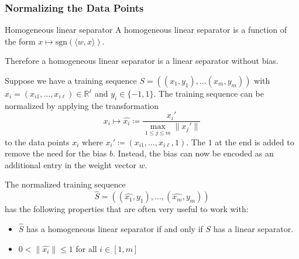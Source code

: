 \documentclass[english]{panikzettel}
\begin{document}
\subsubsection{Normalizing the Data Points}
\begin{defi}{Homogeneous linear separator}
A homogeneous linear separator is a function of the form $x\mapsto \text{sgn}(\langle w,x\rangle)$.
\end{defi}
Therefore a homogeneous linear separator is a linear separator without bias.



Suppose we have a training sequence $S=((x_1,y_1),\ldots (x_m,y_m))$ with $x_i=(x_{i1},\ldots, x_{i\ell})\in \mathbb{R}^\ell$ and $y_i\in \{-1,1\}$. The training sequence can be normalized by applying the transformation
\[
x_i\mapsto\hat{x_i} \coloneqq \frac{x_i'}{\max_{1\leq j\leq m} \parallel x_j'\parallel}
\]
to the data points $x_i$ where $x_i'\coloneqq (x_{i1},\ldots,x_{i\ell},1)$. The $1$ at the end is added to remove the need for the bias $b$. Instead, the bias can now be encoded as an additional entry in the weight vector $w$.

The normalized training sequence
\[
\hat{S}=((\widehat{x_1},y_1),\ldots,(\hat{x_m},y_m))
\]
has the following properties that are often very useful to work with:
\begin{itemize}
\item $\widehat{S}$ has a homogeneous linear separator if and only if $S$ has a linear separator.
\item $0<\parallel\widehat{x_i}\parallel\leq 1$ for all $i\in [1,m]$
\end{itemize}
\end{document}
